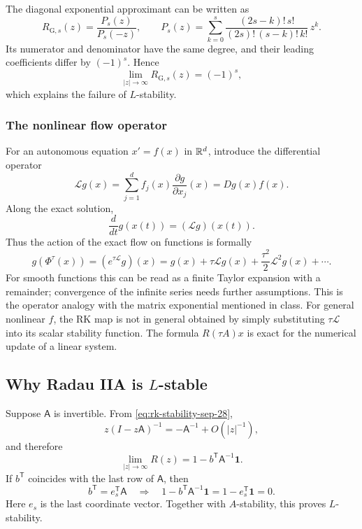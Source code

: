 The diagonal exponential approximant can be written as
\begin{equation}\label{eq:gauss-pade-sep-28}
 R_{\mathrm{G},s}(z)=\frac{P_s(z)}{P_s(-z)},
 \qquad
 P_s(z)=\sum_{k=0}^s
 \frac{(2s-k)!\,s!}{(2s)!\,(s-k)!\,k!}\,z^k.
\end{equation}
Its numerator and denominator have the same degree, and their
leading coefficients differ by \((-1)^s\). Hence
\[
 \lim_{|z|\to\infty}R_{\mathrm{G},s}(z)=(-1)^s,
\]
which explains the failure of \(L\)-stability.

\subsubsection{The nonlinear flow operator}

For an autonomous equation \(x'=f(x)\) in \(\mathbb{R}^d\), introduce
the differential operator
\[
 \mathcal L g(x)=\sum_{j=1}^d f_j(x)\frac{\partial g}{\partial x_j}(x)
               =Dg(x)f(x).
\]
Along the exact solution,
\[
 \frac{d}{dt}g(x(t))=(\mathcal Lg)(x(t)).
\]
Thus the action of the exact flow on functions is formally
\[
 g(\Phi^\tau(x))=(e^{\tau\mathcal L}g)(x)
 =g(x)+\tau\mathcal Lg(x)
       +\frac{\tau^2}{2}\mathcal L^2g(x)+\cdots.
\]
For smooth functions this can be read as a finite Taylor expansion
with a remainder; convergence of the infinite series needs further
assumptions. This is the operator analogy with the matrix
exponential mentioned in class. For general nonlinear \(f\), the
RK map is not in general obtained by simply substituting
\(\tau\mathcal L\) into its scalar stability function. The formula
\(R(\tau A)x\) is exact for the numerical update of a linear system.

\subsection{Why Radau IIA is \texorpdfstring{\(L\)}{L}-stable}

Suppose \(\mathsf A\) is invertible. From
\eqref{eq:rk-stability-sep-28},
\[
 z(I-z\mathsf A)^{-1}=-\mathsf A^{-1}+O(|z|^{-1}),
\]
and therefore
\begin{equation}\label{eq:rk-limit-sep-28}
 \lim_{|z|\to\infty}R(z)
   =1-b^{\mathsf T}\mathsf A^{-1}\mathbf1.
\end{equation}
If \(b^{\mathsf T}\) coincides with the last row of
\(\mathsf A\), then
\[
 b^{\mathsf T}=e_s^{\mathsf T}\mathsf A
 \quad\Longrightarrow\quad
 1-b^{\mathsf T}\mathsf A^{-1}\mathbf1
 =1-e_s^{\mathsf T}\mathbf1=0.
\]
Here \(e_s\) is the last coordinate vector. Together with
\(A\)-stability, this proves \(L\)-stability.

